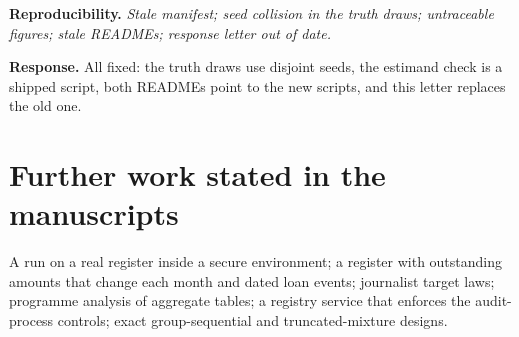 \documentclass[11pt,a4paper]{article}
\newcommand{\point}[2]{\par\medskip\textbf{#1} \emph{#2}\par}
\newcommand{\reply}{\textbf{Response.} }
\begin{document}
\point{Reproducibility.}{Stale manifest; seed collision in the truth draws; untraceable figures; stale READMEs; response letter out of date.}
\reply All fixed: the truth draws use disjoint seeds, the estimand check is a shipped script, both READMEs point to the new scripts, and this letter replaces the old one.

\section*{Further work stated in the manuscripts}
A run on a real register inside a secure environment; a register with outstanding amounts that change each month and dated loan events; journalist target laws; programme analysis of aggregate tables; a registry service that enforces the audit-process controls; exact group-sequential and truncated-mixture designs.
\end{document}
